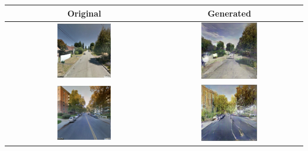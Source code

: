 \begin{table}\sffamily
    \begin{tabular}{l*2{c}@{}}
        \toprule
        & Original & Generated \\ 
        \midrule
        & \includegraphics[width=0.4\textwidth]{Plot/GAN_examples/orig_1} & \includegraphics[width=0.4\textwidth]{Plot/GAN_examples/gan_1} \\ 
        & \includegraphics[width=0.4\textwidth]{Plot/GAN_examples/orig_2} & \includegraphics[width=0.4\textwidth]{Plot/GAN_examples/gan_2} \\ 

\end{tabular}
\end{table}
